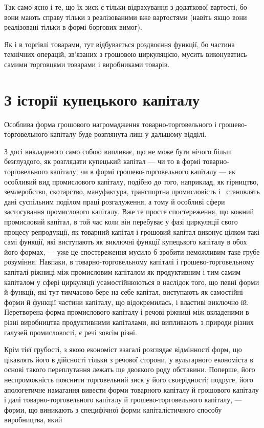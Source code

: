 
Так само ясно і те, що їх зиск є тільки відрахування з додаткової
вартості, бо вони мають справу тільки з реалізованими
вже вартостями (навіть якщо вони реалізовані тільки в формі
боргових вимог).

Як і в торгівлі товарами, тут відбувається роздвоєння функції,
бо частина технічних операцій, зв’язаних з грошовою циркуляцією,
мусить виконуватись самими торговцями товарами
і виробниками товарів.

\section{З історії купецького капіталу}

Особлива форма грошового нагромадження товарно-торговельного
і грошево-торговельного капіталу буде розглянута лиш у
дальшому відділі.

З досі викладеного само собою випливає, що не може бути
нічого більш безглуздого, як розглядати купецький капітал —
чи то в формі товарно-торговельного капіталу, чи в формі грошево-торговельного
капіталу — як особливий вид промислового
капіталу, подібно до того, наприклад, як гірництво, землеробство,
скотарство, мануфактура, транспортна промисловість і~
становлять дані суспільним поділом праці розгалуження, а тому й
особливі сфери застосування промислового капіталу. Вже те
просте спостереження, що кожний промисловий капітал, в той час
коли він перебуває у фазі циркуляції свого процесу репродукції,
як товарний капітал і грошовий капітал виконує цілком такі
самі функції, які виступають як виключні функції купецького
капіталу в обох його формах, — уже це спостереження мусило б
зробити неможливим таке грубе розуміння. Навпаки, в товарно-торговельному
капіталі і грошево-торговельному капіталі ріжниці
між промисловим капіталом як продуктивним і тим самим
капіталом у сфері циркуляції усамостійнюються в наслідок того,
що певні форми й функції, які тут тимчасово бере на себе капітал,
виступають як самостійні форми й функції частини капіталу,
що відокремилась, і властиві виключно їй. Перетворена форма
промислового капіталу і речові ріжниці між вкладеними в різні
виробництва продуктивними капіталами, які випливають з природи
різних галузей промисловості, є речі зовсім різні.

Крім тієї грубості, з якою економіст взагалі розглядає відмінності
форм, що цікавлять його в дійсності тільки з речової сторони,
у вульгарного економіста в основі такого переплутання
лежать ще двоякого роду обставини. Поперше, його неспроможність
пояснити торговельний зиск у його своєрідності; подруге,
його апологетичне намагання вивести форми товарного капіталу
й грошового капіталу і далі товарно-торговельного капіталу й
грошево-торговельного капіталу, — форми, що виникають з специфічної
форми капіталістичного способу виробництва, який
\parbreak{}  %
